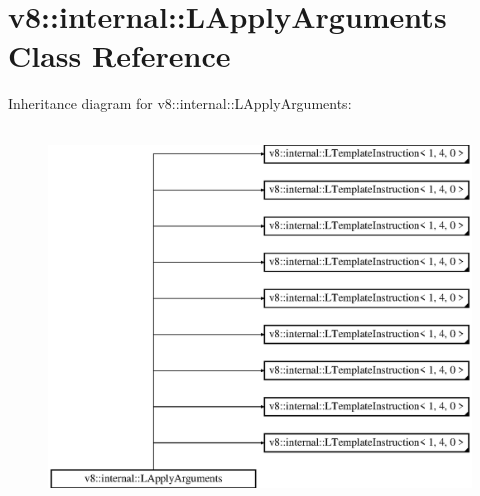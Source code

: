 \hypertarget{classv8_1_1internal_1_1_l_apply_arguments}{}\section{v8\+:\+:internal\+:\+:L\+Apply\+Arguments Class Reference}
\label{classv8_1_1internal_1_1_l_apply_arguments}
Inheritance diagram for v8\+:\+:internal\+:\+:L\+Apply\+Arguments\+:\begin{figure}[H]
\begin{center}
\leavevmode
\includegraphics[height=10.000000cm]{classv8_1_1internal_1_1_l_apply_arguments}
\end{center}
\end{figure}

